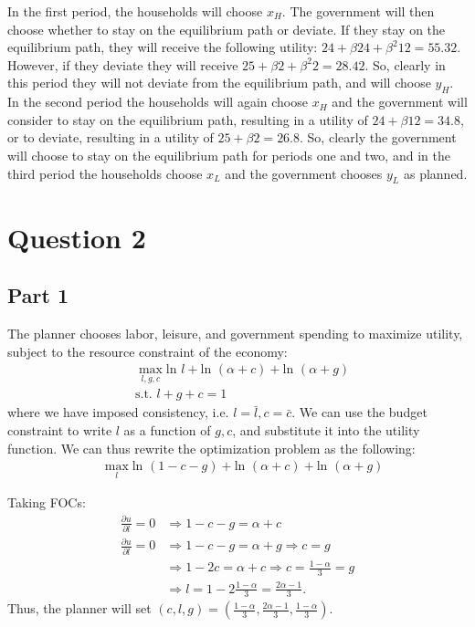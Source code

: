 \documentclass[11pt]{article} %
\begin{document}
In the first period, the households will choose $x_H$. The government will then choose whether to stay on the equilibrium path or deviate. If they stay on the equilibrium path, they will receive the following utility: $24 + \beta 24 + \beta^2 12 = 55.32 $. However, if they deviate they will receive $25 + \beta 2 +\beta^2 2 = 28.42$. So, clearly in this period they will not deviate from the equilibrium path, and will choose $y_H$. In the second period the households will again choose $x_H$ and the government will consider to stay on the equilibrium path, resulting in a utility of $24+\beta 12 = 34.8$, or to deviate, resulting in a utility of $25 +\beta 2 = 26.8$. So, clearly the government will choose to stay on the equilibrium path for periods one and two, and in the third period the households choose $x_L$ and the government chooses $y_L$ as planned. 

\section{Question 2}
\subsection{Part 1}
The planner chooses labor, leisure, and government spending to maximize utility, subject to the resource constraint of the economy:
\begin{align*}
&\max_{l,g,c} \text{ln }l +\text{ln }(\alpha + c) +\text{ln }(\alpha + g)\\
&\text{s.t. } l+g+c = 1
\end{align*}
where we have imposed consistency, i.e. $l = \bar{l},c = \bar{c}$. We can use the budget constraint to write $l$ as a function of $g,c$, and substitute it into the utility function. We can thus rewrite the optimization problem as the following:
\begin{align*}
&\max_{l} \text{ln }(1-c-g) +\text{ln }(\alpha + c) +\text{ln }(\alpha + g)
\end{align*}

Taking FOCs:
\begin{align*}
\frac{\partial u}{\partial l} = 0 &\Rightarrow 1-c-g = \alpha + c \\
\frac{\partial u}{\partial l} = 0 &\Rightarrow 1-c-g = \alpha + g \Rightarrow c=g \\
&\Rightarrow 1-2c = \alpha + c \Rightarrow c = \frac{1-\alpha}{3} = g\\
&\Rightarrow l = 1 - 2\frac{1-\alpha}{3} = \frac{2\alpha -1}{3}.
\end{align*}
Thus, the planner will set $(c,l,g) = \left( \frac{1-\alpha}{3} , \frac{2\alpha -1}{3}, \frac{1-\alpha}{3}  \right)$.
\end{document}
